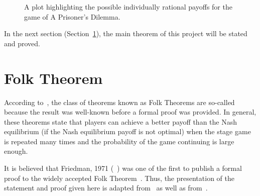 \begin{figure}\label{fig:Feasible_Payoff_Plot}
    \caption{A plot highlighting the possible individually rational payoffs for the game of A Prisoner's Dilemma.}
\end{figure}

In the next section (Section~\ref{sec:Folk_Thm}), the main theorem of this
project will be stated and proved.

\section{Folk Theorem}\label{sec:Folk_Thm}
According to~\cite{Webb2007}, the class of theorems known as Folk Theorems are
so-called because the result was well-known before a formal proof was provided.
In general, these theorems state that players can achieve a better payoff than
the Nash equilibrium (if the Nash equilibrium payoff is not optimal) when the
stage game is repeated many times and the probability of the game continuing is 
large enough. 

It is believed that Friedman, 1971 (~\cite{friedman1971non}) was one of the
first to publish a formal proof to the widely accepted Folk Theorem~\cite{}.
Thus, the presentation of the statement and proof given here is adapted
from~\cite{friedman1971non} as well as from~\cite{Knight2017b}.

